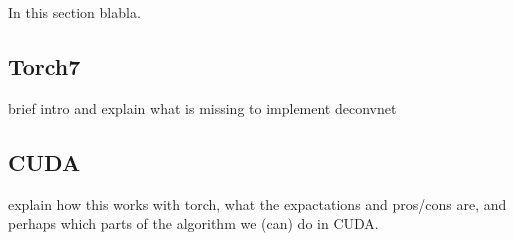In this section blabla. 

\subsection{Torch7}

brief intro and explain what is missing to implement deconvnet

\subsection{CUDA}

explain how this works with torch, what the expactations and pros/cons are, and perhaps which parts of the algorithm we (can) do in CUDA.

\newpage